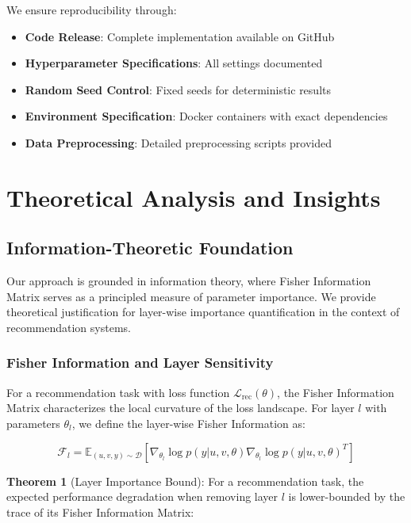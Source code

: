 \documentclass[10pt,conference]{IEEEtran}
\newcommand{\fisher}{\mathcal{F}}
\newcommand{\loss}{\mathcal{L}}
\begin{document}
We ensure reproducibility through:

\begin{itemize}[leftmargin=*]
    \item \textbf{Code Release}: Complete implementation available on GitHub
    \item \textbf{Hyperparameter Specifications}: All settings documented
    \item \textbf{Random Seed Control}: Fixed seeds for deterministic results
    \item \textbf{Environment Specification}: Docker containers with exact dependencies
    \item \textbf{Data Preprocessing}: Detailed preprocessing scripts provided
\end{itemize}

\section{Theoretical Analysis and Insights}

\subsection{Information-Theoretic Foundation}

Our approach is grounded in information theory, where Fisher Information Matrix serves as a principled measure of parameter importance. We provide theoretical justification for layer-wise importance quantification in the context of recommendation systems.

\subsubsection{Fisher Information and Layer Sensitivity}

For a recommendation task with loss function $\loss_{\text{rec}}(\theta)$, the Fisher Information Matrix characterizes the local curvature of the loss landscape. For layer $l$ with parameters $\theta_l$, we define the layer-wise Fisher Information as:

\begin{equation}
\fisher_l = \mathbb{E}_{(u,v,y) \sim \mathcal{D}}\left[\nabla_{\theta_l} \log p(y|u,v,\theta) \nabla_{\theta_l} \log p(y|u,v,\theta)^T\right]
\end{equation}

\textbf{Theorem 1} (Layer Importance Bound): For a recommendation task, the expected performance degradation when removing layer $l$ is lower-bounded by the trace of its Fisher Information Matrix:
\end{document}
